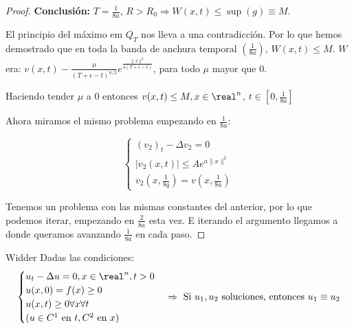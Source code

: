 \begin{proof}
				\textbf{Conclusión:} $T = \frac{1}{8a}$, $R > R_0 \Rightarrow W(x,t) \leq \sup(g) \equiv M$.

				El principio del máximo em $Q_T$ nos lleva a una contradicción. Por lo que hemos demostrado que en toda la banda de anchura temporal $(\frac{1}{8a})$, $W(x,t) \leq M$. $W$ era: $v(x,t) - \frac{\mu}{(T + \epsilon -t)^{n/2}} e^{\frac{\|x\|^2}{4(T + \epsilon - t)}} $, para todo $\mu$ mayor que 0.

				Haciendo tender $\mu$ a 0 entonces $v(x,t) \leq M, x \in \real^n$, $t \in [0,\frac{1}{8a}]$

				Ahora miramos el mismo problema empezando en $\frac{1}{8a}$:

				\[\begin{cases}
					(v_2)_t - \Delta v_2 = 0 \\
					|v_2(x,t)| \leq A e^{a\|x\|^2} \\
					v_2(x,\frac{1}{8q}) = v(x,\frac{1}{8a})
				\end{cases}\]


				Tenemos un problema con las mismas constantes del anterior, por lo que podemos iterar, empezando en $\frac{2}{8a}$ esta vez. E iterando el argumento llegamos a donde queramos avanzando $\frac{1}{8a}$ en cada paso.

			\end{proof}

			\begin{theorem}{Widder}
				Dadas las condiciones:
				\[\begin{cases}
					u_t - \Delta u = 0, x \in \real^n, t > 0 \\
					u(x,0) = f(x) \geq 0 \\
					u(x,t) \geq 0 \forall x \forall t \\
					(u \in C^1 \text{ en } t, C^2 \text{ en } x)
				\end{cases} \Rightarrow \text{ Si } u_1,u_2 \text{ soluciones, entonces } u_1 \equiv u_2\]
			\end{theorem}

